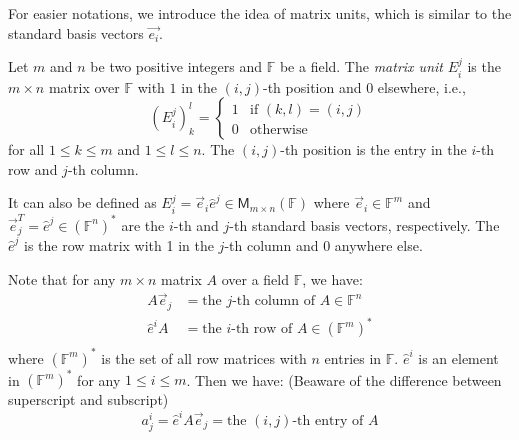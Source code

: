 \documentclass[
	11pt, %
	fleqn, %
	a4paper, %
]{LegrandOrangeBook}
\newcommand{\F}{\mathbb{F}} %
\newcommand{\M}[2]{\mathsf{M}_{#1}(#2)} %
\begin{document}
For easier notations, we introduce the idea of matrix units, which is similar to the standard basis vectors $\vec{e_i}$.

\begin{definition}
    Let $m$ and $n$ be two positive integers and $\F$ be a field. The \emph{matrix unit} $E_i^j$ is the $m \times n$ matrix over $\F$ with $1$ in the $(i,j)$-th position and $0$ elsewhere, i.e.,
    \[
        (E_i^j)_k^l = \begin{cases}
            1 & \text{if } (k,l) = (i,j) \\
            0 & \text{otherwise}
        \end{cases}
    \]
    for all $1 \leq k \leq m$ and $1 \leq l \leq n$. The $(i,j)$-th position is the entry in the $i$-th row and $j$-th column.

    It can also be defined as $E_i^j = \vec{e}_i \hat{e}^j \in \M{m \times n}{\F}$ where $\vec{e}_i \in \F^m$ and $\vec{e}_j^T = \hat{e}^j \in (\F^n)^*$ are the $i$-th and $j$-th standard basis vectors, respectively. The $\hat{e}^j$ is the row matrix with 1 in the $j$-th column and 0 anywhere else.
\end{definition}

\begin{remark}
    Note that for any $m \times n$ matrix $A$ over a field $\F$, we have:
    \[
        \begin{split}
            A\vec{e}_j &= \text{the } j\text{-th column of } A \in \F^n \\
            \hat{e}^iA &= \text{the } i\text{-th row of } A \in (\F^m)^* \\
        \end{split}
    \]
    where $(\F^m)^*$ is the set of all row matrices with $n$ entries in $\F$. $\hat{e}^i$ is an element in $(\F^m)^*$ for any $1 \leq i \leq m$. Then we have: (Beaware of the difference between superscript and subscript)
    \[
        a_j^i = \hat{e}^i A \vec{e}_j = \text{the } (i,j)\text{-th entry of } A
    \]
\end{remark}
\end{document}
